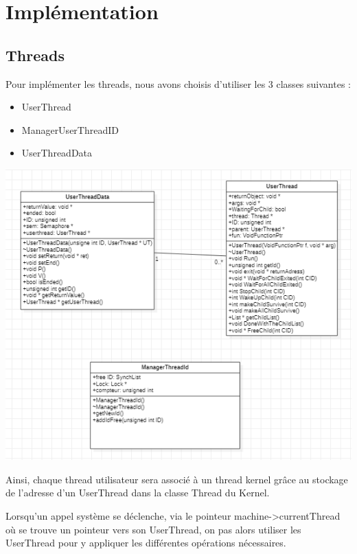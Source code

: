 \documentclass{article}
\begin{document}
\newpage

\section{Implémentation}

\vspace{5mm}

\subsection{Threads}




Pour implémenter les threads, nous avons choisis d'utiliser les 3 classes suivantes :
\begin{itemize}
\item
UserThread
\item
ManagerUserThreadID
\item
UserThreadData
\end{itemize}
\includegraphics{code/userprog/UserThread.PNG}

Ainsi, chaque thread utilisateur sera associé à un thread kernel grâce au stockage de l'adresse d'un UserThread dans la classe Thread du Kernel.


Lorsqu'un appel système se déclenche, via le pointeur machine->currentThread où se trouve un pointeur vers son UserThread, on pas alors utiliser les UserThread pour y appliquer les différentes opérations nécessaires.
\vspace{5mm}
\end{document}

